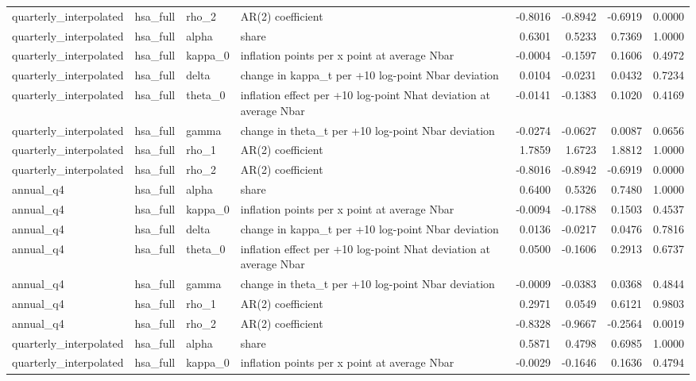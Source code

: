 \begin{tabular}{llllrrrr}
quarterly\_interpolated & hsa\_full & rho\_2 & AR(2) coefficient & -0.8016 & -0.8942 & -0.6919 & 0.0000 \\
quarterly\_interpolated & hsa\_full & alpha & share & 0.6301 & 0.5233 & 0.7369 & 1.0000 \\
quarterly\_interpolated & hsa\_full & kappa\_0 & inflation points per x point at average Nbar & -0.0004 & -0.1597 & 0.1606 & 0.4972 \\
quarterly\_interpolated & hsa\_full & delta & change in kappa\_t per +10 log-point Nbar deviation & 0.0104 & -0.0231 & 0.0432 & 0.7234 \\
quarterly\_interpolated & hsa\_full & theta\_0 & inflation effect per +10 log-point Nhat deviation at average Nbar & -0.0141 & -0.1383 & 0.1020 & 0.4169 \\
quarterly\_interpolated & hsa\_full & gamma & change in theta\_t per +10 log-point Nbar deviation & -0.0274 & -0.0627 & 0.0087 & 0.0656 \\
quarterly\_interpolated & hsa\_full & rho\_1 & AR(2) coefficient & 1.7859 & 1.6723 & 1.8812 & 1.0000 \\
quarterly\_interpolated & hsa\_full & rho\_2 & AR(2) coefficient & -0.8016 & -0.8942 & -0.6919 & 0.0000 \\
annual\_q4 & hsa\_full & alpha & share & 0.6400 & 0.5326 & 0.7480 & 1.0000 \\
annual\_q4 & hsa\_full & kappa\_0 & inflation points per x point at average Nbar & -0.0094 & -0.1788 & 0.1503 & 0.4537 \\
annual\_q4 & hsa\_full & delta & change in kappa\_t per +10 log-point Nbar deviation & 0.0136 & -0.0217 & 0.0476 & 0.7816 \\
annual\_q4 & hsa\_full & theta\_0 & inflation effect per +10 log-point Nhat deviation at average Nbar & 0.0500 & -0.1606 & 0.2913 & 0.6737 \\
annual\_q4 & hsa\_full & gamma & change in theta\_t per +10 log-point Nbar deviation & -0.0009 & -0.0383 & 0.0368 & 0.4844 \\
annual\_q4 & hsa\_full & rho\_1 & AR(2) coefficient & 0.2971 & 0.0549 & 0.6121 & 0.9803 \\
annual\_q4 & hsa\_full & rho\_2 & AR(2) coefficient & -0.8328 & -0.9667 & -0.2564 & 0.0019 \\
quarterly\_interpolated & hsa\_full & alpha & share & 0.5871 & 0.4798 & 0.6985 & 1.0000 \\
quarterly\_interpolated & hsa\_full & kappa\_0 & inflation points per x point at average Nbar & -0.0029 & -0.1646 & 0.1636 & 0.4794 \\

\end{tabular}

